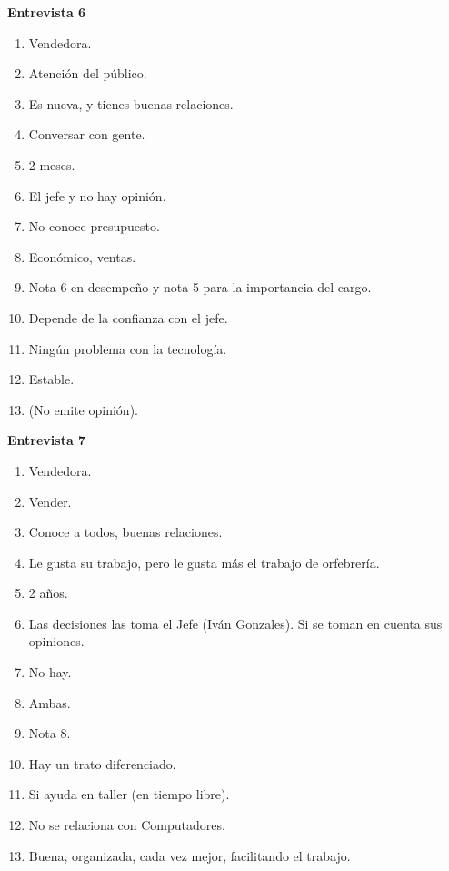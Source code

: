 \newpage
\textbf{Entrevista 6}\\
\begin{enumerate}
	\item Vendedora.
	\item Atención del público.
	\item Es nueva, y tienes buenas relaciones.
	\item Conversar con gente.
	\item 2 meses.
	\item El jefe y no hay opinión.
	\item No conoce presupuesto.
	\item Económico, ventas.
	\item Nota 6 en desempeño y nota 5 para la importancia del cargo.
	\item Depende de la confianza con el jefe.
	\item Ningún problema con la tecnología.
	\item Estable.
	\item (No emite opinión).
\end{enumerate}


\newpage
\textbf{Entrevista 7}\\
\begin{enumerate}
	\item Vendedora.
	\item Vender.
	\item Conoce a todos, buenas relaciones.
	\item Le gusta su trabajo, pero le gusta más el trabajo de orfebrería.
	\item 2 años.
	\item Las decisiones las toma el Jefe (Iván Gonzales). Si se toman en cuenta sus opiniones.
	\item No hay.
	\item Ambas.
	\item Nota 8.
	\item Hay un trato diferenciado.
	\item Si ayuda en taller (en tiempo libre).
	\item No se relaciona con Computadores.
	\item Buena, organizada, cada vez mejor, facilitando el trabajo.
\end{enumerate}

